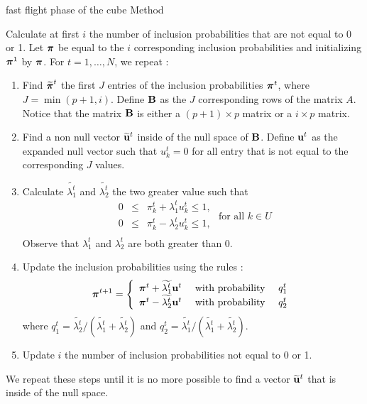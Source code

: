 \documentclass[12pt,english]{article}\usepackage[]{graphicx}\usepackage{xcolor}
\begin{document}
\begin{algorithm}
\caption{fast flight phase of the cube Method}\label{algo:cube}
Calculate at first $i$ the number of inclusion probabilities that are not equal to 0 or 1. Let $\boldsymbol{\pi}$ be equal to the $i$ corresponding inclusion probabilities and initializing $\boldsymbol{\pi}^1$ by $\boldsymbol{\pi}$. For $t = 1,\dots,N$, we repeat :

\begin{enumerate}

\item Find $\widetilde{\boldsymbol{\pi}}^t$ the first $J$ entries of the inclusion probabilities $\boldsymbol{\pi}^t$, where $J = \min(p+1,i)$. Define ${\bf B}$ as the $J$ corresponding rows of the matrix $A$. Notice that the matrix ${\bf B}$ is either a $(p+1)\times p$ matrix or a $i \times p$ matrix.


\item Find a non null vector $\widetilde{{\bf u}}^t$ inside of the null space of ${\bf B}$. Define ${\bf u}^t$ as the expanded null vector such that $u_k^t = 0$ for all entry that is not equal to the corresponding $J$ values.

\item Calculate $\widetilde{\lambda_1^t}$ and $\widetilde{\lambda_2^t}$ the two greater value such that
$$\begin{array}{ccccc} 0 &\leqslant & \pi_k^{t} + \lambda_1^t u_k^t \leqslant 1,\\
0 &\leqslant & \pi_k^{t} - \lambda_2^t u_k^t \leqslant 1,\\
 \end{array} \text{ for all } k \in U$$
Observe that $\lambda_1^t $ and $\lambda_2^t$ are both greater than 0.
 \item Update the inclusion probabilities using the rules :
 $$\boldsymbol{\pi}^{t+1} = \left\{\begin{array}{cccc}
 \boldsymbol{\pi}^{t} + \widetilde{\lambda_1^t}{\bf u}^t & \text{ with probability } & q_1^t\\
 \boldsymbol{\pi}^{t} - \widetilde{\lambda_2^t}{\bf u}^t & \text{ with probability } & q_2^t
 \end{array}\right.$$
 where $q_1^t = \widetilde{\lambda_2^t}/(\widetilde{\lambda_1^t} + \widetilde{\lambda_2^t})$ and  $q_2^t = \widetilde{\lambda_1^t}/(\widetilde{\lambda_1^t} + \widetilde{\lambda_2^t})$.
\item Update $i$ the number of inclusion probabilities not equal to 0 or 1.
\end{enumerate}
We repeat these steps until it is no more possible to find a vector $ \widetilde{{\bf u}}^t$ that is inside of the null space.
\end{algorithm}
\end{document}
